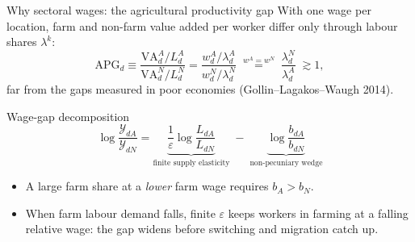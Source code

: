 \documentclass[10pt,aspectratio=169]{beamer}
\newcommand{\hl}[1]{\textcolor{mOrange}{#1}}
\begin{document}
\begin{frame}{Why sectoral wages: the agricultural productivity gap}
  With one wage per location, farm and non-farm value added per worker differ only through
  labour shares $\lambda^k$:
  \begin{equation*}
    \mathrm{APG}_d\equiv\frac{\mathrm{VA}^A_d/L^A_d}{\mathrm{VA}^N_d/L^N_d}
    =\frac{w^A_d/\lambda^A_d}{w^N_d/\lambda^N_d}
    \;\overset{w^A=w^N}{=}\;\frac{\lambda^N_d}{\lambda^A_d}\;\gtrsim 1,
  \end{equation*}
  far from the gaps measured in poor economies (Gollin--Lagakos--Waugh 2014).
  \begin{block}{Wage-gap decomposition}
    \vspace{-0.6em}
    \begin{equation*}
      \log\frac{\mathcal Y_{dA}}{\mathcal Y_{dN}}
      =\underbrace{\frac1\varepsilon\log\frac{L_{dA}}{L_{dN}}}_{\text{finite supply elasticity}}
      \;-\;\underbrace{\log\frac{b_{dA}}{b_{dN}}}_{\text{non-pecuniary wedge}}
    \end{equation*}
  \end{block}
  \footnotesize
  \begin{itemize}
    \item A large farm share at a \emph{lower} farm wage requires $b_A>b_N$.
    \item When farm labour demand falls, finite $\varepsilon$ keeps workers in farming at a
          falling relative wage: the gap \hl{widens} before switching and migration catch
          up.
  \end{itemize}
\end{frame}
\end{document}
